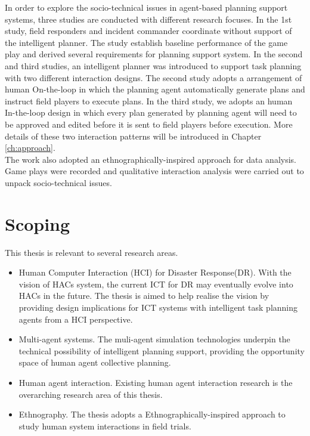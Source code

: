 In order to explore the socio-technical issues in agent-based planning support systems, three studies are conducted with different research focuses. In the 1st study, field responders and incident commander coordinate without support of the intelligent planner. The study establish baseline performance of the game play and derived several requirements for planning support system. In the second and third studies, an intelligent planner was introduced to support task planning with two different interaction designs. The second study adopts a arrangement of human On-the-loop in which the planning agent automatically generate plans and instruct field players to execute plans. In the third study, we adopts an human In-the-loop design in which every plan generated by planning agent will need to be approved and edited before it is sent to field players before execution. More details of these two interaction patterns will be introduced in Chapter \ref{ch:approach}.\\

The work also adopted an ethnographically-inspired approach for data analysis. Game plays were recorded and qualitative interaction analysis were carried out to unpack socio-technical issues.\\


\section{Scoping}\label{sec:custom}

This thesis is relevant to several research areas. \\

\begin{itemize} 
  \item Human Computer Interaction (HCI) for Disaster Response(DR). With the vision of HACs system, the current ICT for DR may eventually evolve into HACs in the future. The thesis is aimed to help realise the vision by providing design implications for ICT systems with intelligent task planning agents from a HCI perspective. 
  \item Multi-agent systems. The muli-agent simulation technologies underpin the technical possibility of intelligent planning support, providing the opportunity space of human agent collective planning. 
  \item Human agent interaction. Existing human agent interaction research is the overarching research area of this thesis. 
  \item Ethnography. The thesis adopts a Ethnographically-inspired approach to study human system interactions in field trials.
\end{itemize}

